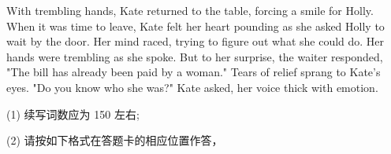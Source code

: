 \documentclass{英语试卷}
\begin{document}
\par With trembling hands, Kate returned to the table, forcing a smile for Holly. When it was time to leave, Kate felt her heart pounding as she asked Holly to wait by the door. Her mind raced, trying to figure out what she could do. Her hands were trembling as she spoke. But to her surprise, the waiter responded, "The bill has already been paid by a woman." Tears of relief sprang to Kate's eyes. "Do you know who she was?" Kate asked, her voice thick with emotion.\par
\par (1) 续写词数应为 150 左右;\par
\par (2) 请按如下格式在答题卡的相应位置作答，\par
{}
\end{document}
